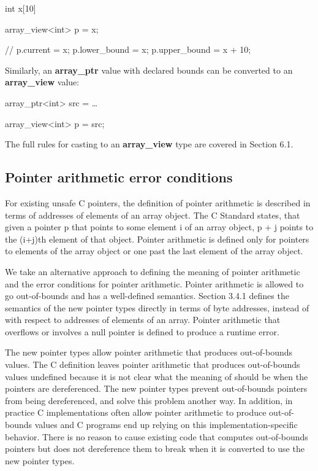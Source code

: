 \documentclass[]{article}
\begin{document}
int x{[}10{]}

array\_view\textless{}int\textgreater{} p = x;

// p.current = x; p.lower\_bound = x; p.upper\_bound = x + 10;

Similarly, an \textbf{array\_ptr} value with declared bounds can be
converted to an \textbf{array\_view} value:

array\_ptr\textless{}int\textgreater{} src = \ldots{}

array\_view\textless{}int\textgreater{} p = src;

The full rules for casting to an \textbf{array\_view} type are covered
in Section 6.1.

\subsection{\texorpdfstring{\protect\hypertarget{ux5fToc424307680}{}{\protect\hypertarget{ux5fToc426641058}{}{\protect\hypertarget{ux5fToc435434918}{}{\protect\hypertarget{ux5fToc437460739}{}{\protect\hypertarget{ux5fToc440445417}{}{\protect\hypertarget{ux5fToc440449199}{}{\protect\hypertarget{ux5fToc440551849}{}{}}}}}}}Pointer
arithmetic error
conditions}{Pointer arithmetic error conditions}}\label{pointer-arithmetic-error-conditions}

For existing unsafe C pointers, the definition of pointer arithmetic is
described in terms of addresses of elements of an array object. The C
Standard states, that given a pointer p that points to some element i of
an array object, p + j points to the (i+j)th element of that object.
Pointer arithmetic is defined only for pointers to elements of the array
object or one past the last element of the array object.

We take an alternative approach to defining the meaning of pointer
arithmetic and the error conditions for pointer arithmetic. Pointer
arithmetic is allowed to go out-of-bounds and has a well-defined
semantics. Section 3.4.1 defines the semantics of the new pointer types
directly in terms of byte addresses, instead of with respect to
addresses of elements of an array. Pointer arithmetic that overflows or
involves a null pointer is defined to produce a runtime error.

The new pointer types allow pointer arithmetic that produces
out-of-bounds values. The C definition leaves pointer arithmetic that
produces out-of-bounds values undefined because it is not clear what the
meaning of should be when the pointers are dereferenced. The new pointer
types prevent out-of-bounds pointers from being dereferenced, and solve
this problem another way. In addition, in practice C implementations
often allow pointer arithmetic to produce out-of-bounds values and C
programs end up relying on this implementation-specific behavior. There
is no reason to cause existing code that computes out-of-bounds pointers
but does not dereference them to break when it is converted to use the
new pointer types.
\end{document}
